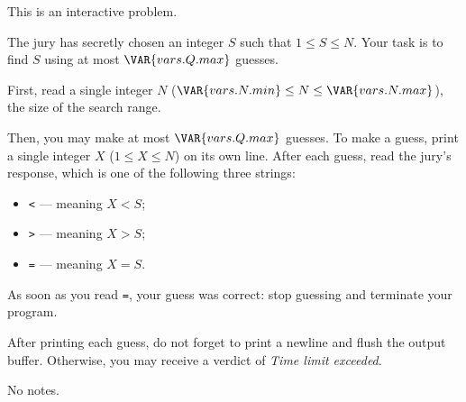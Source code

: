 This is an interactive problem.

The jury has secretly chosen an integer $S$ such that $1 \leq S \leq N$. Your
task is to find $S$ using at most $\VAR{vars.Q.max}$ guesses.

First, read a single integer $N$ ($\VAR{vars.N.min} \leq N \leq \VAR{vars.N.max}$),
the size of the search range.

Then, you may make at most $\VAR{vars.Q.max}$ guesses. To make a guess, print a
single integer $X$ ($1 \leq X \leq N$) on its own line. After each guess, read
the jury's response, which is one of the following three strings:

\begin{itemize}
	\item \texttt{<} --- meaning $X < S$;
	\item \texttt{>} --- meaning $X > S$;
	\item \texttt{=} --- meaning $X = S$.
\end{itemize}

As soon as you read \texttt{=}, your guess was correct: stop guessing and
terminate your program.

After printing each guess, do not forget to print a newline and flush the
output buffer. Otherwise, you may receive a verdict of
\textit{Time limit exceeded}.

No notes.

